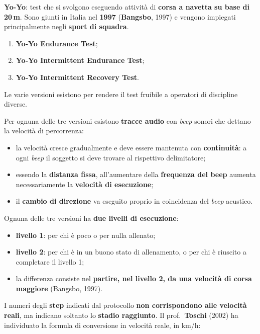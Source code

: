 \textbf{Yo-Yo}: test che si svolgono eseguendo attività di \textbf{corsa a navetta su base di
20\,m}. Sono giunti in Italia nel \textbf{1997} (\textbf{Bangsbo}, 1997) e vengono impiegati
principalmente negli \textbf{sport di squadra}.

\begin{enumerate}
  \item \textbf{Yo-Yo Endurance Test};
  \item \textbf{Yo-Yo Intermittent Endurance Test};
  \item \textbf{Yo-Yo Intermittent Recovery Test}.
\end{enumerate}

Le varie versioni esistono per rendere il test fruibile a operatori di discipline diverse.

Per ognuna delle tre versioni esistono \textbf{tracce audio} con \textit{beep} sonori che dettano
la velocità di percorrenza:

\begin{itemize}
  \item la velocità cresce gradualmente e deve essere mantenuta con \textbf{continuità}: a ogni
    \textit{beep} il soggetto si deve trovare al rispettivo delimitatore;
  \item essendo la \textbf{distanza fissa}, all'aumentare della \textbf{frequenza del beep} aumenta
    necessariamente la \textbf{velocità di esecuzione};
  \item il \textbf{cambio di direzione} va eseguito proprio in coincidenza del \textit{beep}
    acustico.
\end{itemize}

Ognuna delle tre versioni ha \textbf{due livelli di esecuzione}:

\begin{itemize}
  \item \textbf{livello 1}: per chi è poco o per nulla allenato;
  \item \textbf{livello 2}: per chi è in un buono stato di allenamento, o per chi è riuscito a
    completare il livello 1;
  \item la differenza consiste nel \textbf{partire, nel livello 2, da una velocità di corsa
    maggiore} (Bangsbo, 1997).
\end{itemize}

I numeri degli \textbf{step} indicati dal protocollo \textbf{non corrispondono alle velocità
reali}, ma indicano soltanto lo \textbf{stadio raggiunto}. Il prof.\ \textbf{Toschi} (2002) ha
individuato la formula di conversione in velocità reale, in km/h:

